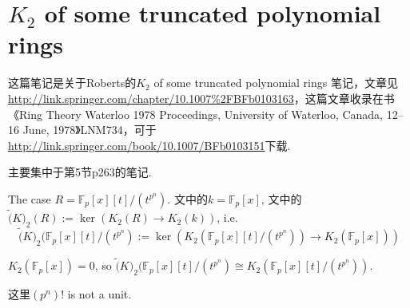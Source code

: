 \section{$K_2$ of some truncated polynomial rings}
这篇笔记是关于Roberts的$K_2$ of some truncated polynomial rings 笔记，文章见\url{http://link.springer.com/chapter/10.1007%2FBFb0103163}，这篇文章收录在书《Ring Theory Waterloo 1978 Proceedings, University of Waterloo, Canada, 12–16 June, 1978》LNM734，可于\url{http://link.springer.com/book/10.1007/BFb0103151}下载.

主要集中于第5节p263的笔记.

The case $R=\mathbb{F}_p[x][t]/(t^{p^n})$. 文中的$k=\mathbb{F}_p[x]$,
文中的$\tilde(K)_2(R):= \ker(K_2(R)\rightarrow K_2(k))$, i.e. 
\[\tilde(K)_2(\mathbb{F}_p[x][t]/(t^{p^n}):= \ker(K_2(\mathbb{F}_p[x][t]/(t^{p^n}))\rightarrow K_2(\mathbb{F}_p[x]))\]

$K_2(\mathbb{F}_p[x])=0$, so $\tilde(K)_2(\mathbb{F}_p[x][t]/(t^{p^n}) \cong K_2(\mathbb{F}_p[x][t]/(t^{p^n}))$.

这里$(p^n)!$ is not a unit.